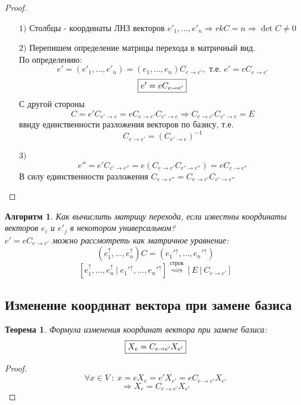 \documentclass[a4paper, 12pt]{article}
\newcommand\tab[1][.5cm]{\hspace*{#1}}
\theoremstyle{definition}
\theoremstyle{plain}
\newtheorem*{theorem}{Теорема}
\newtheorem*{algorithm}{Алгоритм}
\theoremstyle{remark}
\begin{document}
  \begin{proof}\tab
    \begin{itemize}
      \item[$1)$] Столбцы - координаты ЛНЗ векторов $e'_1,...,e'_n \Longrightarrow rkC = n \Longrightarrow \det C \neq 0$
      \item[$2)$] Перепишем определение матрицы перехода в матричный вид. \\
      По определению: 
      $$e'=(e'_1,...,e'_n) = (e_1,...,e_n)C_{e \to e'}, \text{ т.е. } e' = eC_{e \to e'}$$
      \begin{equation}
        \fbox{$e' = eC_{e \to e'}$}
      \end{equation}
      С другой стороны 
      $$C = e'C_{e' \to e} = eC_{e \to e'}C_{e' \to e} \Longrightarrow C_{e \to e'}C_{e' \to e} = E$$ 
      ввиду единственности разложения векторов по базису, т.е. 
      $$C_{e \to e'} = (C_{e' \to e})^{-1}$$
      \item[$3)$] $$e'' = e'C_{e' \to e''} = e(C_{e \to e'}C_{e' \to e''}) = eC_{e \to e''}$$
      В силу единственности разложения $C_{e \to e''} = C_{e \to e'}C_{e' \to e''}$     
    \end{itemize}
  \end{proof} 
  \begin{algorithm}
    Как вычислить матрицу перехода, если известны координаты векторов $e_i$ и $e'_j$ в некотором универсальном?\\
    $e' = eC_{e \to e'}$ можно рассмотреть как матричное уравнение:
    $$(e_1^{\uparrow},...,e_n^{\uparrow})C = ({e_1'}^{\uparrow},...,{e_n'}^{\uparrow})$$
    $$[e_1^{\uparrow},...,e_n^{\uparrow} \ | \ {e_1'}^{\uparrow},...,{e_n'}^{\uparrow}] \overset{\text{строк}}{\rightsquigarrow} [E \ | \ C_{e \to e'}]$$   
  \end{algorithm}
  \subsection{Изменение координат вектора при замене базиса}
  \begin{theorem}
    Формула изменения координат вектора при замене базиса:
    \begin{equation}
      \fbox{$X_e = C_{e \to e'}X_{e'}$} 
    \end{equation}
  \end{theorem} 
  \begin{proof}
    $$\forall x \in V \ : \ x = eX_e = e'X_{e'} = eC_{e \to e'}X_{e'}$$
    $$\Longrightarrow  X_e = C_{e \to e'}X_{e'}$$ 
  \end{proof}
\end{document}
